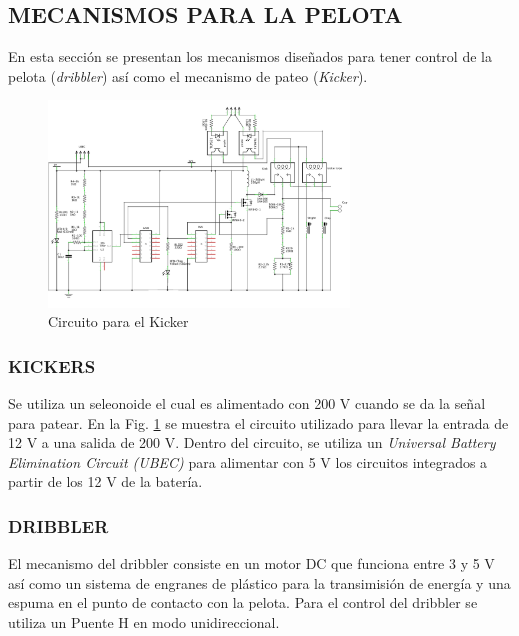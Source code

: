 \documentclass[twocolumn,10pt]{amrob}
\begin{document}
\subsection*{MECANISMOS PARA LA PELOTA}
En esta sección se presentan los mecanismos diseñados para tener control de la pelota (\textit{dribbler}) así como el mecanismo de pateo (\textit{Kicker}).
\begin{figure}
  \centering
    \includegraphics[width=8cm]{circuitoKicker.png}
  \caption{Circuito para el Kicker}
  \label{fig:elecKicker}
\end{figure}
\subsubsection*{KICKERS}
Se utiliza un seleonoide el cual es alimentado con 200 V cuando se da la señal para patear. En la Fig. \ref{fig:elecKicker} se muestra el circuito utilizado para llevar la entrada de 12 V a una salida de 200 V. Dentro del circuito, se utiliza un \textit{Universal Battery Elimination Circuit (UBEC)} para alimentar con 5 V los circuitos integrados a partir de los 12 V de la batería. \par
\subsubsection*{DRIBBLER}
El mecanismo del dribbler consiste en un motor DC que funciona entre 3 y 5 V así como un sistema de engranes de plástico para la transimisión de energía y una espuma en el punto de contacto con la pelota. Para el control del dribbler se utiliza un Puente H en modo unidireccional. \par 
\end{document}
